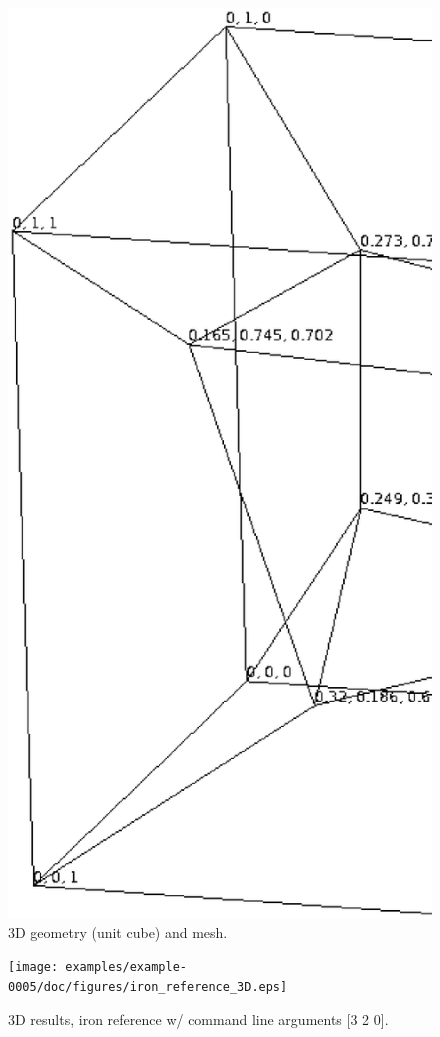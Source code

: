 \begin{figure}[h!]
    \centering 
    \includegraphics[width=0.9\columnwidth]{examples/example-0005/doc/figures/3d_mesh.eps} 
    \caption{3D geometry (unit cube) and mesh.}
    \label{3d-mesh-fig}
\end{figure}
%
\begin{figure}[h!]
    \centering 
    \texttt{[image: examples/example-0005/doc/figures/iron\_reference\_3D.eps]} 
    \caption{3D results, iron reference w/ command line arguments [3 2 0].}
    \label{example-0005-iron-3D-reference-fig}
\end{figure}
%
